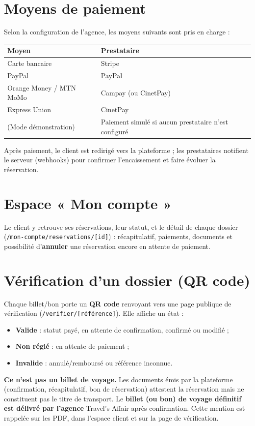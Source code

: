 \documentclass[11pt,a4paper]{article}
\newcommand{\chemin}[1]{\textcolor{taStone}{\texttt{#1}}}
\begin{document}
\section{Moyens de paiement}
Selon la configuration de l'agence, les moyens suivants sont pris en charge :
\begin{center}
\begin{longtable}{>{\raggedright}p{4.6cm} p{8.8cm}}
\toprule
\textbf{Moyen} & \textbf{Prestataire} \\
\midrule
\endhead
Carte bancaire & Stripe \\
PayPal & PayPal \\
Orange Money / MTN MoMo & Campay (ou CinetPay) \\
Express Union & CinetPay \\
(Mode démonstration) & Paiement simulé si aucun prestataire n'est configuré \\
\bottomrule
\end{longtable}
\end{center}
Après paiement, le client est redirigé vers la plateforme ; les prestataires notifient le
serveur (webhooks) pour confirmer l'encaissement et faire évoluer la réservation.

\section{Espace « Mon compte »}
Le client y retrouve ses réservations, leur statut, et le détail de chaque dossier
(\chemin{/mon-compte/reservations/[id]}) : récapitulatif, paiements, documents et possibilité
d'\textbf{annuler} une réservation encore en attente de paiement.

\section{Vérification d'un dossier (QR code)}
Chaque billet/bon porte un \textbf{QR code} renvoyant vers une page publique de vérification
(\chemin{/verifier/[référence]}). Elle affiche un état :
\begin{itemize}[leftmargin=1.4em]
  \item \textbf{Valide} : statut payé, en attente de confirmation, confirmé ou modifié ;
  \item \textbf{Non réglé} : en attente de paiement ;
  \item \textbf{Invalide} : annulé/remboursé ou référence inconnue.
\end{itemize}

\begin{attention}
\textbf{Ce n'est pas un billet de voyage.} Les documents émis par la plateforme (confirmation,
récapitulatif, bon de réservation) attestent la réservation mais ne constituent pas le titre de
transport. Le \textbf{billet (ou bon) de voyage définitif est délivré par l'agence} Travel's
Affair après confirmation. Cette mention est rappelée sur les PDF, dans l'espace client et sur
la page de vérification.
\end{attention}
\end{document}
